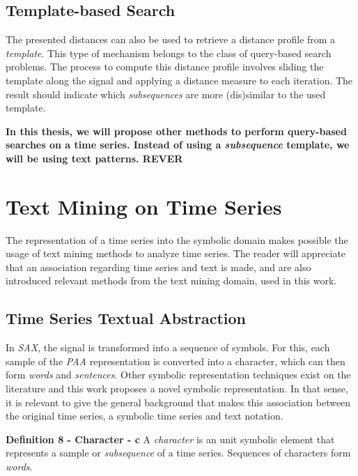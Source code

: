 \subsection{Template-based Search}
\label{sec:query_based_search}

The presented distances can also be used to retrieve a distance profile from a \textit{template}. This type of mechanism belongs to the class of query-based search problems. The process to compute this distance profile involves sliding the template along the signal and applying a distance measure to each iteration. The result should indicate which \textit{subsequences} are more (dis)similar to the used template.
\par


\textbf{In this thesis, we will propose other methods to perform query-based searches on a time series. Instead of using a \textit{subsequence} template, we will be using text patterns. REVER}

\section{Text Mining on Time Series}
\label{sec:text_time}

The representation of a time series into the symbolic domain makes possible the usage of text mining methods to analyze time series. The reader will appreciate that an association regarding time series and text is made, and are also introduced relevant methods from the text mining domain, used in this work.

\subsection{Time Series Textual Abstraction}
\label{subsec:text_abstraction}

In \textit{SAX}, the signal is transformed into a sequence of symbols. For this, each sample of the \textit{PAA} representation is converted into a character, which can then form \textit{words} and \textit{sentences}. Other symbolic representation techniques exist on the literature and this work proposes a novel symbolic representation. In that sense, it is relevant to give the general background that makes this association between the original time series, a symbolic time series and text notation. 

\item \textbf{Definition 8 - Character - c} A \textit{character} is an unit symbolic element that represents a sample or \textit{subsequence} of a time series. Sequences of characters form \textit{words}.

